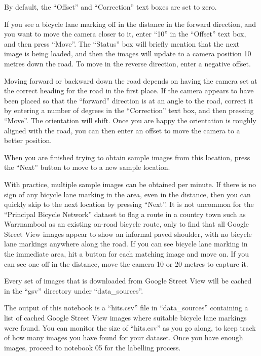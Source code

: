 \documentclass[11pt,twoside]{report}
\begin{document}
By default, the ``Offset'' and ``Correction'' text boxes are set to zero.

If you see a bicycle lane marking off in the distance in the forward direction, and you want to move the camera closer to it, enter ``10'' in the ``Offset'' text box, and then press ``Move''.  The ``Status'' box will briefly mention that the next image is being loaded, and then the images will update to a camera position 10 metres down the road.  To move in the reverse direction, enter a negative offset.

Moving forward or backward down the road depends on having the camera set at the correct heading for the road in the first place.  If the camera appears to have been placed so that the ``forward'' direction is at an angle to the road, correct it by entering  a number of degrees in the ``Correction'' text box, and then pressing ``Move''.  The orientation will shift.  Once you are happy the orientation is roughly aligned with the road, you can then enter an offset to move the camera to a better position.

When you are finished trying to obtain sample images from this location, press the ``Next'' button to move to a new sample location.

With practice, multiple sample images can be obtained per minute.  If there is no sign of any bicycle lane marking in the area, even in the distance, then you can quickly skip to the next location by pressing ``Next''.  It is not uncommon for the ``Principal Bicycle Network'' dataset to flag a route in a country town such as Warrnambool as an existing on-road bicycle route, only to find that all Google Street View images appear to show an informal paved shoulder, with no bicycle lane markings anywhere along the road.  If you can see bicycle lane marking in the immediate area, hit a button for each matching image and move on.  If you can see one off in the distance, move the camera 10 or 20 metres to capture it.

Every set of images that is downloaded from Google Street View will be cached in the ``gsv'' directory under ``data\_sources''.

The output of this notebook is a ``hits.csv'' file in ``data\_sources'' containing a list of cached Google Street View images where suitable bicycle lane markings were found.  You can monitor the size of ``hits.csv'' as you go along, to keep track of how many images you have found for your dataset.  Once you have enough images, proceed to notebook 05 for the labelling process.
\end{document}
